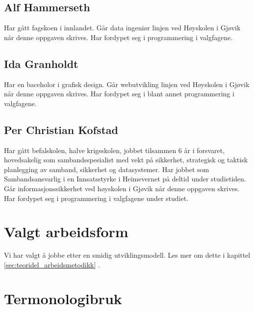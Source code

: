 \subsection{Alf Hammerseth}
Har gått fagskoen i innlandet. 
Går data ingeniør linjen ved Høyskolen i Gjøvik når denne oppgaven skrives. Har fordypet seg i programmering i valgfagene.

\subsection{Ida Granholdt}
Har en baceholor i grafisk design.
Går webutvikling linjen ved Høyskolen i Gjøvik når denne oppgaven skrives. Har fordypet seg i blant annet programmering i valgfagene. 

\subsection{Per Christian Kofstad}
Har gått befalskolen, halve krigsskolen, jobbet tilsammen 6 år i forsvaret, hovedsakelig som sambandsspesialist med vekt på sikkerhet, strategisk og taktisk planlegging av samband, sikkerhet og datasystemer. 
Har jobbet som Sambandsansvarlig i en Innsatsstyrke i Heimevernet på deltid under studietiden.
Går informasjonssikkerhet ved høyskolen i Gjøvik når denne oppgaven skrives. Har fordypet seg i programmering i valgfagene under studiet. 

\section{Valgt arbeidsform}
\label{sec:problemstilling_valgtArbeidsform}
Vi har valgt å jobbe etter en smidig utviklingsmodell. Les mer om dette i kapittel \ref{sec:teoridel_arbeidsmetodikk} .

\section{Termonologibruk}
\label{sec:problemstilling_termonoligbruk}
\begin{itemize}

\end{itemize}

